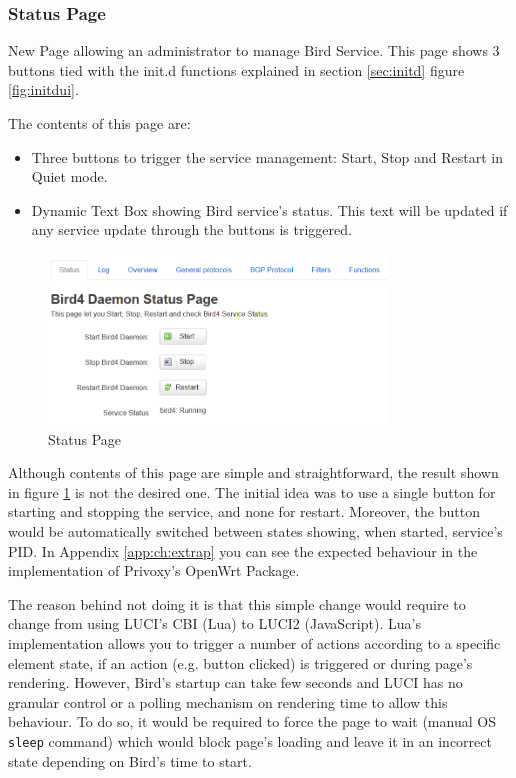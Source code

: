 \subsubsection{Status Page}
New Page allowing an administrator to manage Bird Service. This page shows 3 buttons tied with the init.d functions explained in section \ref{sec:initd} figure \ref{fig:initdui}.


The contents of this page are:
\begin{itemize}
    \item Three buttons to trigger the service management: Start, Stop and Restart in Quiet mode.
    \item Dynamic Text Box showing Bird service's status. This text will be updated if any service update through the buttons is triggered.
\end{itemize}

\begin{figure}[H]
    \centering
    \includegraphics[width=0.8\textwidth]{images/bird0.3/status}
    \caption{Status Page}
    \label{fig:statusp}
\end{figure}

Although contents of this page are simple and straightforward, the result shown in figure \ref{fig:statusp} is not the desired one. The initial idea was to use a single button for starting and stopping the service, and none for restart. Moreover, the button would be automatically switched between states showing, when started, service's PID. In Appendix \ref{app:ch:extrap} you can see the expected behaviour in the implementation of Privoxy's OpenWrt Package.

The reason behind not doing it is that this simple change would require to change from using LUCI's CBI (Lua) to LUCI2 (JavaScript). Lua's implementation allows you to trigger a number of actions according to a specific element state, if an action (e.g. button clicked) is triggered or during page's rendering. However, Bird's startup can take few seconds and LUCI has no granular control or a polling mechanism on rendering time to allow this behaviour. To do so, it would be required to force the page to wait (manual OS \texttt{sleep} command) which would block page's loading and leave it in an incorrect state depending on Bird's time to start.

